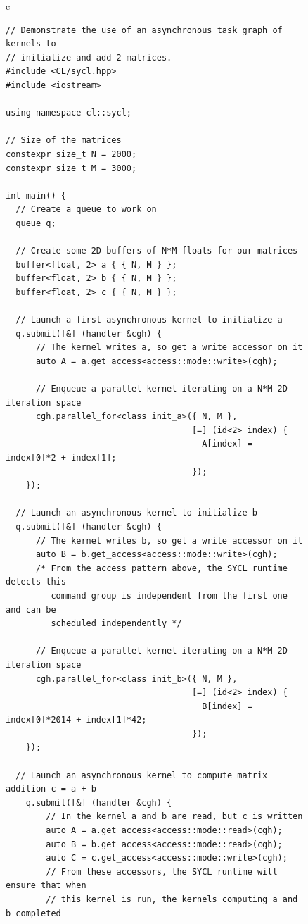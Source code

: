 \documentclass[sigplan]{acmart}
\begin{document}
\begin{figure}
  \begin{tabular}{c}
    \begin{lstlisting}[basicstyle=\scriptsize]
// Demonstrate the use of an asynchronous task graph of kernels to
// initialize and add 2 matrices.
#include <CL/sycl.hpp>
#include <iostream>

using namespace cl::sycl;

// Size of the matrices
constexpr size_t N = 2000;
constexpr size_t M = 3000;

int main() {
  // Create a queue to work on
  queue q;

  // Create some 2D buffers of N*M floats for our matrices
  buffer<float, 2> a { { N, M } };
  buffer<float, 2> b { { N, M } };
  buffer<float, 2> c { { N, M } };

  // Launch a first asynchronous kernel to initialize a
  q.submit([&] (handler &cgh) {
      // The kernel writes a, so get a write accessor on it
      auto A = a.get_access<access::mode::write>(cgh);

      // Enqueue a parallel kernel iterating on a N*M 2D iteration space
      cgh.parallel_for<class init_a>({ N, M },
                                     [=] (id<2> index) {
                                       A[index] = index[0]*2 + index[1];
                                     });
    });

  // Launch an asynchronous kernel to initialize b
  q.submit([&] (handler &cgh) {
      // The kernel writes b, so get a write accessor on it
      auto B = b.get_access<access::mode::write>(cgh);
      /* From the access pattern above, the SYCL runtime detects this
         command group is independent from the first one and can be
         scheduled independently */

      // Enqueue a parallel kernel iterating on a N*M 2D iteration space
      cgh.parallel_for<class init_b>({ N, M },
                                     [=] (id<2> index) {
                                       B[index] = index[0]*2014 + index[1]*42;
                                     });
    });

  // Launch an asynchronous kernel to compute matrix addition c = a + b
    q.submit([&] (handler &cgh) {
        // In the kernel a and b are read, but c is written
        auto A = a.get_access<access::mode::read>(cgh);
        auto B = b.get_access<access::mode::read>(cgh);
        auto C = c.get_access<access::mode::write>(cgh);
        // From these accessors, the SYCL runtime will ensure that when
        // this kernel is run, the kernels computing a and b completed


\end{lstlisting}
\end{tabular}
\end{figure}
\end{document}
